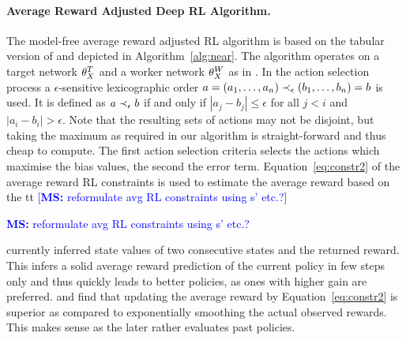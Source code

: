 \documentclass[envcountsame]{llncs}
\newcommand\MS[2][r]{\ifx t#1 \textcolor{blue}{[\textbf{MS:} #2]}
  \else \begin{center}\textcolor{blue}{\textbf{MS:} #2} \end{center} \fi}
\begin{document}
\paragraph{Average Reward Adjusted Deep RL Algorithm.} %
The model-free average reward adjusted RL algorithm is based on the tabular version of
\citet{schneckenreither2020average} and depicted in Algorithm~\ref{alg:near}. The algorithm operates
on a target network \(\theta_X^{T}{}\) and a worker network \(\theta_X^{W}{}\) as in
\citet{mnih2015human}. %
%
In the action selection process a \(\epsilon\)-sensitive lexicographic order
\(a=(a_{1},\ldots,a_{n}) \prec_{\epsilon} (b_{1},\ldots,b_{n})=b\) is used. It is defined as \(a \prec_{\epsilon} b\) if and
only if \(| a_{j} - b_{j} | \leqslant \epsilon\) for all \(j < i\) and
\(|a_{i} - b_{i}| > \epsilon\). Note that the resulting sets of actions may not be disjoint, but
taking the maximum as required in our algorithm is straight-forward and thus cheap to compute. The
first action selection criteria selects the actions which maximise the bias values, the second the
error term.
%
Equation~\ref{eq:constr2} of the average reward RL constraints is used to estimate the average
reward based on the \MS[t]{reformulate avg RL constraints using s' etc.?} currently inferred state
values of two consecutive states and the returned reward. %
This infers a solid average reward prediction of the current policy in few steps only and thus
quickly leads to better policies, as ones with higher gain are preferred.
\citet{schneckenreither2020average} and
\citet{Tadepalli98_ModelbasedAverageRewardReinforcementLearning} find that updating the average
reward by Equation~\ref{eq:constr2} is superior as compared to exponentially smoothing the actual
observed rewards. This makes sense as the later rather evaluates past policies.
\end{document}

